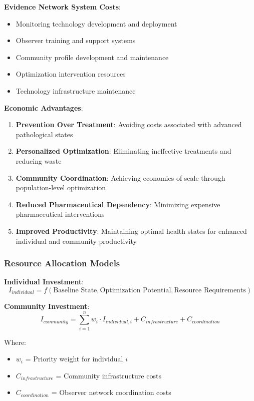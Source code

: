 \documentclass[12pt,a4paper]{article}
\begin{document}
\textbf{Evidence Network System Costs}:
\begin{itemize}
\item Monitoring technology development and deployment
\item Observer training and support systems
\item Community profile development and maintenance
\item Optimization intervention resources
\item Technology infrastructure maintenance
\end{itemize}

\textbf{Economic Advantages}:
\begin{enumerate}
\item \textbf{Prevention Over Treatment}: Avoiding costs associated with advanced pathological states
\item \textbf{Personalized Optimization}: Eliminating ineffective treatments and reducing waste
\item \textbf{Community Coordination}: Achieving economies of scale through population-level optimization
\item \textbf{Reduced Pharmaceutical Dependency}: Minimizing expensive pharmaceutical interventions
\item \textbf{Improved Productivity}: Maintaining optimal health states for enhanced individual and community productivity
\end{enumerate}

\subsubsection{Resource Allocation Models}

\textbf{Individual Investment}:
\begin{equation}
I_{individual} = f(\text{Baseline State}, \text{Optimization Potential}, \text{Resource Requirements})
\end{equation}

\textbf{Community Investment}:
\begin{equation}
I_{community} = \sum_{i=1}^{n} w_i \cdot I_{individual,i} + C_{infrastructure} + C_{coordination}
\end{equation}

Where:
\begin{itemize}
\item $w_i$ = Priority weight for individual $i$
\item $C_{infrastructure}$ = Community infrastructure costs
\item $C_{coordination}$ = Observer network coordination costs
\end{itemize}
\end{document}
